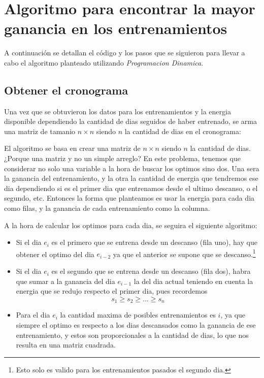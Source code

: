 \section{Algoritmo para encontrar la mayor ganancia en los entrenamientos}

A continuación se detallan el código y los pasos que se siguieron para llevar a cabo el algoritmo planteado utilizando \textit{Programacion Dinamica}.

\subsection{Obtener el cronograma}

Una vez que se obtuvieron los datos para los entrenamientos y la energia disponible dependiendo la cantidad de dias seguidos de haber entrenado, se arma una matriz de tamanio $n \times n$ siendo $n$ la cantidad de dias en el cronograma:



El algoritmo se basa en crear una matriz de $n \times n$ siendo $n$ la cantidad de dias. ¿Porque una matriz y no un simple arreglo? En este problema, tenemos que considerar no solo una variable a la hora de buscar los optimos sino dos. Una sera la ganancia del entrenamiento, y la otra la cantidad de energia que tendremos ese dia dependiendo si es el primer dia que entrenamos desde el ultimo descanso, o el segundo, etc. Entonces la forma que planteamos es usar la energia para cada dia como filas, y la ganancia de cada entrenamiento como la columna.

A la hora de calcular los optimos para cada dia, se seguira el siguiente algoritmo:
\begin{itemize}
    \item Si el dia $e_i$ es el primero que se entrena desde un descanso (fila uno), hay que obtener el optimo del dia $e_{i-2}$ ya que el anterior se supone que se descanso.\footnote{Esto solo es valido para los entrenamientos pasados el segundo dia.}
    \item Si el dia $e_i$ es el segundo que se entrena desde un descanso (fila dos), habra que sumar a la ganancia del dia $e_{i-1}$ la del dia actual teniendo en cuenta la energia que se redujo respecto el primer dia, pues recordemos 
    \[ s_1 \geq s_2 \geq ... \geq s_n\]
    \item Para el dia $e_i$ la cantidad maxima de posibles entrenamientos es $i$, ya que siempre el optimo es respecto a los dias descansados como la ganancia de ese entrenamiento, y estos son proporcionales a la cantidad de dias, lo que nos resulta en una matriz cuadrada.
\end{itemize}

